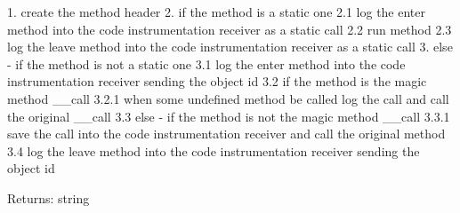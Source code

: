 1. create the method header 2. if the method is a static one 2.1 log the enter method into the code instrumentation receiver as a static call 2.2 run method 2.3 log the leave method into the code instrumentation receiver as a static call 3. else - if the method is not a static one 3.1 log the enter method into the code instrumentation receiver sending the object id 3.2 if the method is the magic method \_\-\_\-call 3.2.1 when some undefined method be called log the call and call the original \_\-\_\-call 3.3 else - if the method is not the magic method \_\-\_\-call 3.3.1 save the call into the code instrumentation receiver and call the original method 3.4 log the leave method into the code instrumentation receiver sending the object id

\begin{Desc}
\item[Returns:]string \end{Desc}


